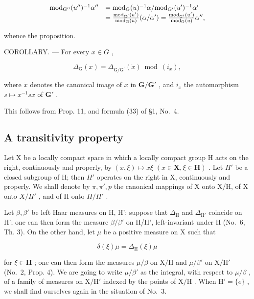 \[
\begin{array}{r l} \mathrm{mod} _ {\mathrm{G} ^ {\prime \prime}} (u ^ {\prime \prime}) ^ {- 1} \alpha^ {\prime \prime} & = \mathrm{mod} _ {\mathrm{G}} (u) ^ {- 1} \alpha / \mathrm{mod} _ {\mathrm{G} ^ {\prime}} (u ^ {\prime}) ^ {- 1} \alpha^ {\prime} \\ & = \frac {\mathrm{mod} _ {\mathrm{G} ^ {\prime}} (u ^ {\prime})}{\mathrm{mod} _ {\mathrm{G}} (u)} (\alpha / \alpha^ {\prime}) = \frac {\mathrm{mod} _ {\mathrm{G} ^ {\prime}} (u ^ {\prime})}{\mathrm{mod} _ {\mathrm{G}} (u)} \alpha^ {\prime \prime}, \end{array}
\]

whence the proposition.

COROLLARY. --- For every \(x \in G\) ,

\[
\Delta_ {\mathrm{G}} (x) = \Delta_ {\mathrm{G} / \mathrm{G} ^ {\prime}} (\dot {x}) \bmod (i _ {x}),
\]

where \(\dot{x}\) denotes the canonical image of \(x\) in \(\mathbf{G} / \mathbf{G}'\) , and \(i_x\) the automorphism \(s \mapsto x^{-1}sx\) of \(\mathbf{G}'\) .

This follows from Prop. 11, and formula (33) of §1, No.~4.

\subsection{A transitivity property}

Let X be a locally compact space in which a locally compact group H acts on the right, continuously and properly, by \((x,\xi)\mapsto x\xi\) \((x\in\mathbf{X},\xi\in\mathbf{H})\) . Let \(H'\) be a closed subgroup of H; then \(H'\) operates on the right in X, continuously and properly. We shall denote by \(\pi,\pi',p\) the canonical mappings of X onto X/H, of X onto \(X/H'\) , and of H onto \(H/H'\) .

Let \(\beta, \beta'\) be left Haar measures on H, H'; suppose that \(\Delta_{\mathrm{H}}\) and \(\Delta_{\mathrm{H}'}\) coincide on H'; one can then form the measure \(\beta / \beta'\) on H/H', left-invariant under H (No.~6, Th. 3). On the other hand, let \(\mu\) be a positive measure on X such that

\[
\delta (\xi) \mu = \Delta_ {\mathrm{H}} (\xi) \mu
\]

for \(\xi \in \mathbf{H}\) ; one can then form the measures \(\mu / \beta\) on \(\mathrm{X} / \mathrm{H}\) and \(\mu / \beta'\) on \(\mathrm{X} / \mathrm{H}'\) (No.~2, Prop. 4). We are going to write \(\mu / \beta'\) as the integral, with respect to \(\mu / \beta\) , of a family of measures on \(\mathrm{X} / \mathrm{H}'\) indexed by the points of \(\mathrm{X} / \mathrm{H}\) . When \(\mathrm{H}' = \{e\}\) , we shall find ourselves again in the situation of No.~3.

